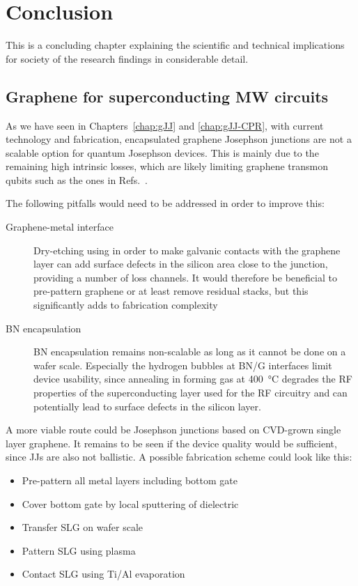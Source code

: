 \newchapstyle
\chapter{Conclusion}
\label{conclusion}

\afterpage{\pagecolor{none}}\newpage
This is a concluding chapter explaining the scientific and technical
implications for society of the research findings in considerable detail.

\section{Graphene for superconducting MW circuits}

As we have seen in Chapters~\ref{chap:gJJ} and \ref{chap:gJJ-CPR}, with current technology and fabrication, encapsulated graphene Josephson junctions are not a scalable option for quantum Josephson devices.
%
This is mainly due to the remaining high intrinsic losses, which are likely limiting graphene transmon qubits such as the ones in Refs.~\cite{krollMagneticFieldCompatible2018,wangCoherentControlHybrid2019}.

The following pitfalls would need to be addressed in order to improve this:
\begin{description}
	\item[Graphene-metal interface] Dry-etching using  in order to make galvanic contacts with the graphene layer can add surface defects in the silicon area close to the junction, providing a number of loss channels.
	It would therefore be beneficial to pre-pattern graphene or at least remove residual stacks, but this significantly adds to fabrication complexity
	\item[BN encapsulation] BN encapsulation remains non-scalable as long as it cannot be done on a wafer scale.
	Especially the hydrogen bubbles at BN/G interfaces limit device usability, since annealing in forming gas at \SI{400}{\celsius} degrades the RF properties of the superconducting layer used for the RF circuitry and can potentially lead to surface defects in the silicon layer.
\end{description}

A more viable route could be Josephson junctions based on CVD-grown single layer graphene.
%
It remains to be seen if the device quality would be sufficient, since  JJs are also not ballistic.
%
A possible fabrication scheme could look like this:
%
\begin{itemize}
	\item Pre-pattern all metal layers including bottom gate
	\item Cover bottom gate by local sputtering of dielectric
	\item Transfer SLG on wafer scale
	\item Pattern SLG using  plasma
	\item Contact SLG using Ti/Al evaporation
\end{itemize}


